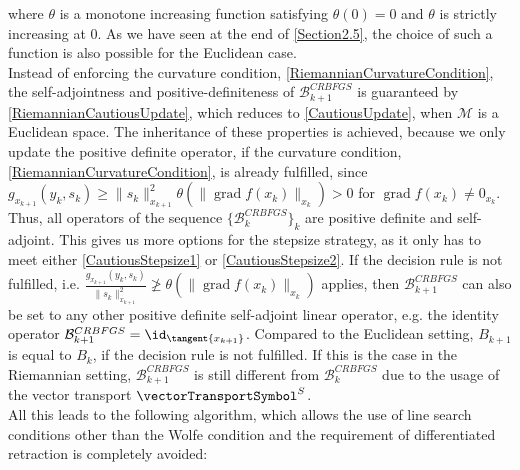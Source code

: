 where $\theta$ is a monotone increasing function satisfying $\theta(0) = 0$ and $\theta$ is strictly increasing at $0$. As we have seen at the end of \cref{Section2.5}, the choice of such a function is also possible for the Euclidean case.\\
Instead of enforcing the curvature condition, \cref{RiemannianCurvatureCondition}, the self-adjointness and positive-definiteness of $\mathcal{B}^{CRBFGS}_{k+1}$ is guaranteed by \cref{RiemannianCautiousUpdate}, which reduces to \cref{CautiousUpdate}, when $\mathcal{M}$ is a Euclidean space. The inheritance of these properties is achieved, because we only update the positive definite operator, if the curvature condition, \cref{RiemannianCurvatureCondition}, is already fulfilled, since $g_{x_{k+1}}(y_k,s_k) \geq \lVert s_k \rVert^{2}_{x_{k+1}} \theta(\lVert \operatorname{grad} f(x_k) \rVert_{x_k}) > 0$ for $\operatorname{grad} f(x_k) \neq 0_{x_k}$. Thus, all operators of the sequence $\{\mathcal{B}^{CRBFGS}_k\}_k$ are positive definite and self-adjoint. This gives us more options for the stepsize strategy, as it only has to meet either \cref{CautiousStepsize1} or \cref{CautiousStepsize2}. If the decision rule is not fulfilled, i.e. $\frac{g_{x_{k+1}}(y_k,s_k)}{\lVert s_k \rVert^{2}_{x_{k+1}}} \ngeq \theta(\lVert \operatorname{grad} f(x_k) \rVert_{x_k})$ applies, then $\mathcal{B}^{CRBFGS}_{k+1}$ can also be set to any other positive definite self-adjoint linear operator, e.g. the identity operator $\mathcal{B}^{CRBFGS}_{k+1} = \id_{\tangent{x_{k+1}}}$. Compared to the Euclidean setting, $B_{k+1}$ is equal to $B_k$, if the decision rule is not fulfilled. If this is the case in the Riemannian setting, $\mathcal{B}^{CRBFGS}_{k+1}$ is still different from $\mathcal{B}^{CRBFGS}_k$ due to the usage of the vector transport $\vectorTransportSymbol^S$. \\
All this leads to the following algorithm, which allows the use of line search conditions other than the Wolfe condition and the requirement of differentiated retraction is completely avoided:

